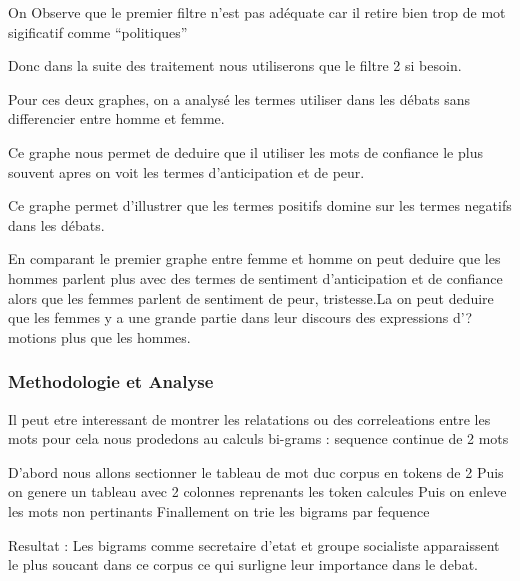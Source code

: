 \documentclass[]{article}
\begin{document}
On Observe que le premier filtre n'est pas adéquate car il retire bien
trop de mot sigificatif comme ``politiques''

Donc dans la suite des traitement nous utiliserons que le filtre 2 si
besoin.

Pour ces deux graphes, on a analysé les termes utiliser dans les débats
sans differencier entre homme et femme.

Ce graphe nous permet de deduire que il utiliser les mots de confiance
le plus souvent apres on voit les termes d'anticipation et de peur.

Ce graphe permet d'illustrer que les termes positifs domine sur les
termes negatifs dans les débats.

En comparant le premier graphe entre femme et homme on peut deduire que
les hommes parlent plus avec des termes de sentiment d'anticipation et
de confiance alors que les femmes parlent de sentiment de peur,
tristesse.La on peut deduire que les femmes y a une grande partie dans
leur discours des expressions d'?motions plus que les hommes.

\subsubsection{Methodologie et Analyse}\label{methodologie-et-analyse}

Il peut etre interessant de montrer les relatations ou des correleations
entre les mots pour cela nous prodedons au calculs bi-grams : sequence
continue de 2 mots

D'abord nous allons sectionner le tableau de mot duc corpus en tokens de
2 Puis on genere un tableau avec 2 colonnes reprenants les token
calcules Puis on enleve les mots non pertinants Finallement on trie les
bigrams par fequence

Resultat : Les bigrams comme secretaire d'etat et groupe socialiste
apparaissent le plus soucant dans ce corpus ce qui surligne leur
importance dans le debat.
\end{document}
